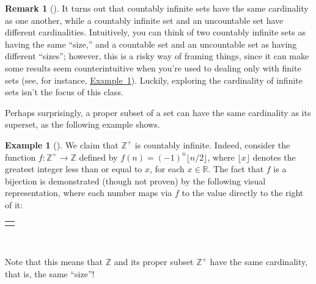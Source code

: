 \documentclass[10pt,]{book}
\theoremstyle{plain}
\theoremstyle{definition}
\theoremstyle{definition}
\newtheorem{remark}[theorem]{Remark}
\theoremstyle{definition}
\newtheorem{example}[theorem]{Example}
\theoremstyle{definition}
\numberwithin{equation}{section}
\newlength{\panelmax}
\def\Z{\mathbb{Z}}
\def\R{\mathbb{R}}
\begin{document}
\begin{remark}[]\label{remark-3}
It turns out that countably infinite sets have the same cardinality as one another, while a countably infinite set and an uncountable set have different cardinalities. Intuitively, you  can think  of two countably infinite sets as having the same ``size,'' and a countable set and an uncountable set as having different ``sizes''; however, this is a risky way of framing things, since it can  make some results seem counterintuitive when you're used to dealing only with finite sets (see, for instance, \hyperref[zplus]{Example~\ref{zplus}}).  Luckily, exploring the cardinality of infinite sets isn't the focus of this class.%
\end{remark}
Perhaps surprisingly, a proper subset of a set can have the same cardinality as its superset, as the following example shows.%
\begin{example}[]\label{zplus}
We claim that \(\Z^+\) is countably infinite. Indeed, consider the function \(f:\Z^+ \to \Z\) defined by \(f(n)=(-1)^n \lfloor n/2 \rfloor\), where \(\lfloor x \rfloor\) denotes the greatest integer less than or equal to \(x\), for each \(x\in \R\). The fact that \(f\) is a bijection is demonstrated (though not proven) by the following visual representation, where each number maps via \(f\) to the value directly to the right of it:%
{%
\setlength{\panelmax}{0pt}
\newsavebox{\panelboxAtabular}
\newlength{\phAtabular}\setlength{\phAtabular}{\ht\panelboxAtabular+\dp\panelboxAtabular}
\settototalheight{\phAtabular}{\usebox{\panelboxAtabular}}
\setlength{\panelmax}{\maxof{\panelmax}{\phAtabular}}
\leavevmode%
\setlength{\tabcolsep}{0\linewidth}
\par\medskip\noindent
\begin{tabular}{@{}*{1}{c}@{}}
\begin{minipage}[c][\panelmax][t]{1\linewidth}\usebox{\panelboxAtabular}\end{minipage}\end{tabular}\\
}%
\par
Note that this means that \(\Z\) and its proper subset \(\Z^+\) have the same cardinality, that is, the same ``size''!%
\end{example}
\end{document}
